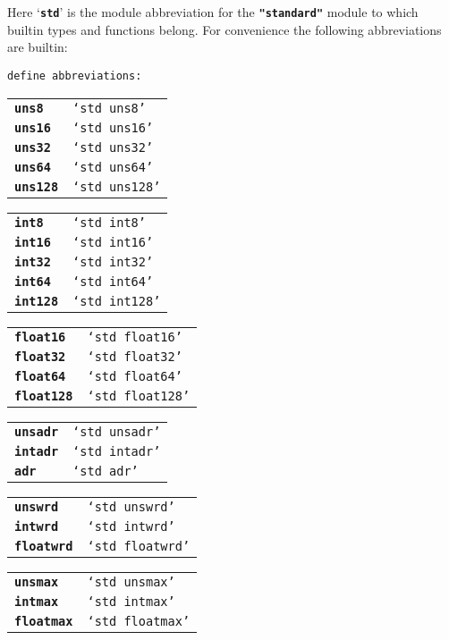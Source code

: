 \documentclass[12pt]{article}
\makeatletter
\newcommand{\TT}[1]{{\tt \bfseries #1}}
\newcommand{\ttkey}[1]{\TT{#1}\index{#1@{\tt #1}}}
\newcommand{\ABV}{-{}-{}->}		%
\newenvironment{indpar}[1][0.3in]%
	{\begin{list}{}%
		     {\setlength{\itemsep}{0in}%
		      \setlength{\topsep}{0in}%
		      \setlength{\parsep}{1ex}%
		      \setlength{\labelwidth}{#1}%
		      \setlength{\leftmargin}{#1}%
		      \addtolength{\leftmargin}{\labelsep}}%
	 \item}%
	{\end{list}}
\makeatother
\begin{document}
Here `\TT{std}' is the module abbreviation for the \TT{"standard"}
module to which builtin types and functions belong.  For convenience
the following abbreviations are builtin:
\begin{indpar}
{\tt define abbreviations:}
\begin{indpar}[0.3in]

\begin{tabular}{p{0.8in}@{\tt ~\ABV~}l}
\ttkey{uns8} & {\tt `std~uns8'} \\
\ttkey{uns16} & {\tt `std~uns16'} \\
\ttkey{uns32} & {\tt `std~uns32'} \\
\ttkey{uns64} & {\tt `std~uns64'} \\
\ttkey{uns128} & {\tt `std~uns128'} \\
\end{tabular}

\begin{tabular}{p{0.8in}@{\tt ~\ABV~}l}
\ttkey{int8} & {\tt `std~int8'} \\
\ttkey{int16} & {\tt `std~int16'} \\
\ttkey{int32} & {\tt `std~int32'} \\
\ttkey{int64} & {\tt `std~int64'} \\
\ttkey{int128} & {\tt `std~int128'} \\
\end{tabular}

\begin{tabular}{p{0.8in}@{\tt ~\ABV~}l}
\ttkey{float16} & {\tt `std~float16'} \\
\ttkey{float32} & {\tt `std~float32'} \\
\ttkey{float64} & {\tt `std~float64'} \\
\ttkey{float128} & {\tt `std~float128'} \\
\end{tabular}

\begin{tabular}{p{0.8in}@{\tt ~\ABV~}l}
\ttkey{unsadr} & {\tt `std~unsadr'} \\
\ttkey{intadr} & {\tt `std~intadr'} \\
\ttkey{adr} & {\tt `std~adr'} \\
\end{tabular}

\begin{tabular}{p{0.8in}@{\tt ~\ABV~}l}
\ttkey{unswrd} & {\tt `std~unswrd'} \\
\ttkey{intwrd} & {\tt `std~intwrd'} \\
\ttkey{floatwrd} & {\tt `std~floatwrd'} \\
\end{tabular}

\begin{tabular}{p{0.8in}@{\tt ~\ABV~}l}
\ttkey{unsmax} & {\tt `std~unsmax'} \\
\ttkey{intmax} & {\tt `std~intmax'} \\
\ttkey{floatmax} & {\tt `std~floatmax'} \\
\end{tabular}

\end{indpar}
\end{indpar}
\end{document}
